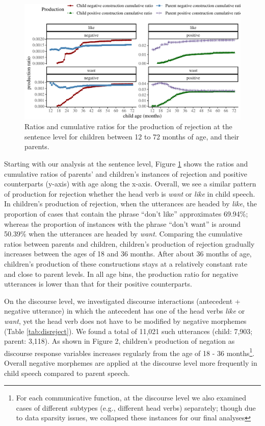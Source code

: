 \documentclass[
  english,
  man,floatsintext]{apa6}
\begin{document}
\begin{figure}[H]

{\centering \includegraphics{neg_construction_article_files/figure-latex/emotion-1} 

}

\caption{Ratios and cumulative ratios for the production of rejection at the sentence level for children between 12 to 72 months of age, and their parents.}\label{fig:emotion}
\end{figure}

Starting with our analysis at the sentence level, Figure \ref{fig:emotion} shows the ratios and cumulative ratios of parents' and children's instances of rejection and positive counterparts (y-axis) with age along the x-axis. Overall, we see a similar pattern of production for rejection whether the head verb is \emph{want} or \emph{like} in child speech. In children's production of rejection, when the utterances are headed by \emph{like}, the proportion of cases that contain the phrase ``don't like'' approximates 69.94\%; whereas the proportion of instances with the phrase ``don't want'' is around 50.39\% when the utterances are headed by \emph{want}. Comparing the cumulative ratios between parents and children, children's production of rejection gradually increases between the ages of 18 and 36 months. After about 36 months of age, children's production of these constructions stays at a relatively constant rate and close to parent levels. In all age bins, the production ratio for negative utterances is lower than that for their positive counterparts.

On the discourse level, we investigated discourse interactions (antecedent + negative utterance) in which the antecedent has one of the head verbs \emph{like} or \emph{want}, yet the head verb does not have to be modified by negative morphemes (Table \ref{tab:disreject}). We found a total of 11,021 such utterances (child: 7,903; parent: 3,118). As shown in Figure 2, children's production of negation as discourse response variables increases regularly from the age of 18 - 36 months\footnote{For each communicative function, at the discourse level we also examined cases of different subtypes (e.g., different head verbs) separately; though due to data sparsity issues, we collapsed these instances for our final analyses}. Overall negative morphemes are applied at the discourse level more frequently in child speech compared to parent speech.
\end{document}
